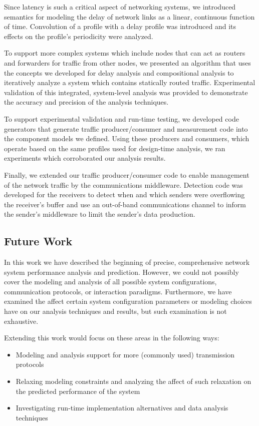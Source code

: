 Since latency is such a critical aspect of networking systems, we
introduced semantics for modeling the delay of network links as a
linear, continuous function of time.  Convolution of a profile with a
delay profile was introduced and its effects on the profile's
periodicity were analyzed.

To support more complex systems which include nodes that can act as
routers and forwarders for traffic from other nodes, we presented an
algorithm that uses the concepts we developed for delay analysis and
compositional analysis to iteratively analyze a system which contains
statically routed traffic.  Experimental validation of this
integrated, system-level analysis was provided to demonstrate the
accuracy and precision of the analysis techniques.  

To support experimental validation and run-time testing, we developed
code generators that generate traffic producer/consumer and
measurement code into the component models we defined.  Using these
producers and consumers, which operate based on the same profiles used
for design-time analysis, we ran experiments which corroborated our
analysis results.

Finally, we extended our traffic producer/consumer code to enable
management of the network traffic by the communications middleware.
Detection code was developed for the receivers to detect when and
which senders were overflowing the receiver's buffer and use an
out-of-band communications channel to inform the sender's middleware
to limit the sender's data production.  

\subsection{Future Work}
\label{subsec:future_work}
In this work we have described the beginning of precise, comprehensive
network system performance analysis and prediction.  However, we could
not possibly cover the modeling and analysis of all possible system
configurations, communication protocols, or interaction paradigms.
Furthermore, we have examined the affect certain system configuration
parameters or modeling choices have on our analysis techniques and
results, but such examination is not exhaustive.

Extending this work would focus on these areas in the following ways:

\begin{itemize}
  \item Modeling and analysis support for more (commonly used)
    transmission protocols
  \item Relaxing modeling constraints and analyzing the affect of such
    relaxation on the predicted performance of the system
  \item Investigating run-time implementation alternatives and data
    analysis techniques
\end{itemize}

